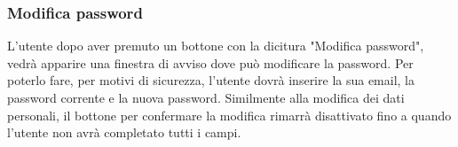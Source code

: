 \subsubsection{Modifica password}
L'utente dopo aver premuto un bottone con la dicitura "Modifica password", vedrà apparire una finestra di avviso dove può modificare la password. Per poterlo fare, per motivi di sicurezza, l'utente dovrà inserire la sua email, la password corrente e la nuova password. Similmente alla modifica dei dati personali, il bottone per confermare la modifica rimarrà disattivato fino a quando l'utente non avrà completato tutti i campi.